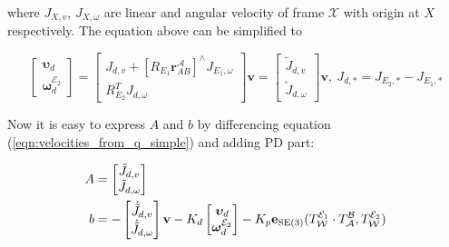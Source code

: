 where $J_{X,v}$, $J_{X,\omega}$ are linear and angular velocity of frame 
$\mathcal{X}$ with origin at $X$ respectively. The equation above can be simplified  
to 

\begin{equation}
    \begin{bmatrix}
        \boldsymbol{\upsilon}_d \\
        \boldsymbol{\omega}_d^{\mathcal{E}_2}
    \end{bmatrix} = 
    \begin{bmatrix}
        J_{d, v} + [R_{E_1} \mathbf{r}_{AB}^{\mathcal{A}}]^{\wedge}
        J_{E_1, \omega}\\
        R_{E_2}^T J_{d, \omega}
    \end{bmatrix} \mathbf{v} = 
    \begin{bmatrix}
        \tilde{J}_{d,v} \\
        \tilde{J}_{d, \omega}
    \end{bmatrix}
    \mathbf{v}, \:
    J_{d, *} = J_{E_2, *} - J_{E_1, *}
    \label{eqn:velocities_from_q_simple}
\end{equation}

Now it is easy to express $A$ and $b$ by differencing equation 
(\ref{eqn:velocities_from_q_simple}) and adding PD part:

\begin{equation}
    \begin{aligned}
        A & = 
        \begin{bmatrix}
            \tilde{J}_{d,v} \\
            \tilde{J}_{d,\omega}
        \end{bmatrix} \\
        b & = 
        - 
        \begin{bmatrix}
            \dot{\tilde{J}}_{d,v} \\
            \dot{\tilde{J}}_{d,\omega}
        \end{bmatrix}
        \mathbf{v}
        -K_d
        \begin{bmatrix}
            \boldsymbol{\upsilon}_d \\
            \boldsymbol{\omega}_d^{\mathcal{E}_2}
        \end{bmatrix} 
        -K_p
        \mathbf{e}_{\text{SE}(3)}(
            T_{\mathcal{W}}^{\mathcal{E}_1} \cdot 
            T_{\mathcal{A}}^{\mathcal{B}},
            T_{\mathcal{W}}^{\mathcal{E}_2}
        )
    \end{aligned}
    \label{eqn:a_and_b}
\end{equation}

